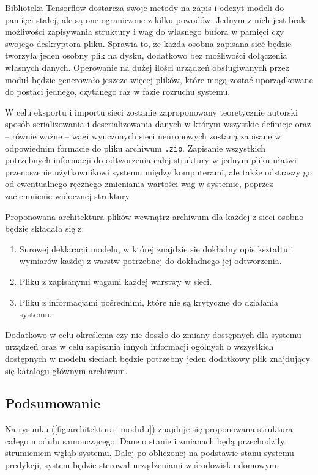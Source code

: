 Biblioteka Tensorflow dostarcza swoje metody na zapis i odczyt modeli do pamięci stałej, ale są one ograniczone z kilku powodów. Jednym z nich jest brak możliwości zapisywania struktury i wag do własnego bufora w pamięci czy swojego deskryptora pliku. Sprawia to, że każda osobna zapisana sieć będzie tworzyła jeden osobny plik na dysku, dodatkowo bez możliwości dołączenia własnych danych. Operowanie na dużej ilości urządzeń obsługiwanych przez moduł będzie generowało jeszcze więcej plików, które mogą zostać uporządkowane do postaci jednego, czytanego raz w fazie rozruchu systemu.

W celu eksportu i importu sieci zostanie zaproponowany teoretycznie autorski sposób serializowania i deserializowania danych \cite{book:serialization_deserialization} w którym wszystkie definicje oraz -- równie ważne -- wagi wyuczonych sieci neuronowych zostaną zapisane w odpowiednim formacie do pliku archiwum \verb+.zip+. Zapisanie wszystkich potrzebnych informacji do odtworzenia całej struktury w jednym pliku ułatwi przenoszenie użytkownikowi systemu między komputerami, ale także odstraszy go od ewentualnego ręcznego zmieniania wartości wag w systemie, poprzez zaciemnienie widocznej struktury.

Proponowana architektura plików wewnątrz archiwum dla każdej z sieci osobno będzie składała się z:
\begin{enumerate}
    \item Surowej deklaracji modelu, w której znajdzie się dokładny opis kształtu i wymiarów każdej z warstw potrzebnej do dokładnego jej odtworzenia.
    \item Pliku z zapisanymi wagami każdej warstwy w sieci.
    \item Pliku z informacjami pośrednimi, które nie są krytyczne do działania systemu.
\end{enumerate}

Dodatkowo w celu określenia czy nie doszło do zmiany dostępnych dla systemu urządzeń oraz w celu zapisania innych informacji ogólnych o wszystkich dostępnych w modelu sieciach będzie potrzebny jeden dodatkowy plik znajdujący się katalogu głównym archiwum.

\subsection{Podsumowanie}
Na rysunku (\ref{fig:architektura_modułu}) znajduje się proponowana struktura całego modułu samouczącego. Dane o stanie i zmianach będą przechodziły strumieniem wgłąb systemu. Dalej po obliczonej na podstawie stanu systemu predykcji, system będzie sterował urządzeniami w środowisku domowym.

